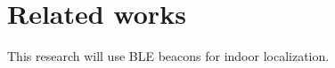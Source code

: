 \chapter{Related works}
\label{chap:related-work}

This research will use BLE beacons for indoor localization.